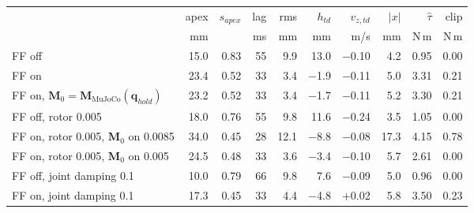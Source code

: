 \begin{tabular}{lrrrrrrrrr}
\toprule
 & apex & $s_{apex}$ & lag & rms & $h_{td}$ & $v_{z,td}$ & $|x|$ & $\hat\tau$ & clip \\
 & mm & & ms & mm & mm & m/s & mm & N\,m & N\,m \\
\midrule
FF off & 15.0 & 0.83 & 55 & 9.9 & 13.0 & $-$0.10 & 4.2 & 0.95 & 0.00 \\
FF on & 23.4 & 0.52 & 33 & 3.4 & $-$1.9 & $-$0.11 & 5.0 & 3.31 & 0.21 \\
FF on, $\mathbf{M}_0 = \mathbf{M}_{\mathrm{MuJoCo}}(\mathbf{q}_{hold})$ & 23.2 & 0.52 & 33 & 3.4 & $-$1.7 & $-$0.11 & 5.2 & 3.30 & 0.21 \\
\midrule
FF off, rotor 0.005 & 18.0 & 0.76 & 55 & 9.8 & 11.6 & $-$0.24 & 3.5 & 1.05 & 0.00 \\
FF on, rotor 0.005, $\mathbf{M}_0$ on 0.0085 & 34.0 & 0.45 & 28 & 12.1 & $-$8.8 & $-$0.08 & 17.3 & 4.15 & 0.78 \\
FF on, rotor 0.005, $\mathbf{M}_0$ on 0.005 & 24.5 & 0.48 & 33 & 3.6 & $-$3.4 & $-$0.10 & 5.7 & 2.61 & 0.00 \\
\midrule
FF off, joint damping 0.1 & 10.0 & 0.79 & 66 & 9.8 & 7.6 & $-$0.09 & 5.0 & 0.96 & 0.00 \\
FF on, joint damping 0.1 & 17.3 & 0.45 & 33 & 4.4 & $-$4.8 & $+$0.02 & 5.8 & 3.50 & 0.23 \\
\bottomrule
\end{tabular}
